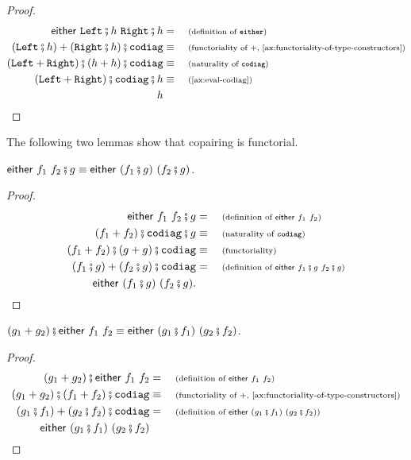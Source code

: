 \begin{proof}
    \begin{align*}
        \either{\leftterm \comp h }{\rightterm \comp h} &= \why{definition of $\mathtt{either}$} \\ 
        (\leftterm \comp h) + (\rightterm \comp h) \comp \codiagterm \equalbecause{functoriality of $+$, \cref{ax:functoriality-of-type-constructors}} \\ 
        (\leftterm + \rightterm) \comp (h + h) \comp \codiagterm \equalbecause{naturality of $\codiagterm$} \\ 
        (\leftterm + \rightterm) \comp \codiagterm \comp h \equalbecause{\cref{ax:eval-codiag}} \\ 
        h
    \end{align*}
\end{proof}

The following two lemmas show that copairing is functorial.
\begin{lemma}\label{lem:functoriality-of-either}
    $\either{f_1}{f_2}\comp g \equiv \either{(f_1\comp g)}{(f_2\comp g)}$.
\end{lemma}
    \begin{proof}
        \begin{align*}
            \either{f_1}{f_2}\comp g &= \why{definition of $\either{f_1}{f_2}$}\\
             (f_1 + f_2)\comp\codiagterm\comp g \equalbecause{naturality of $\codiagterm$}\\
             (f_1 + f_2)\comp(g+g)\comp\codiagterm \equalbecause{functoriality}\\
             (f_1\comp g) + (f_2\comp g)\comp\codiagterm &= \why{definition of $\either{f_1\comp g}{f_2\comp g}$}\\
            \either{(f_1\comp g)}{(f_2\comp g)}.
        \end{align*}
    \end{proof}

\begin{lemma}\label{lem:functoriality-of-either-left}
    $(g_1 + g_2) \comp \either{f_1}{f_2} \equiv \either{(g_1 \comp f_1)}{(g_2 \comp f_2)}$.
\end{lemma}
    \begin{proof}
        \begin{align*}
            (g_1 + g_2) \comp \either{f_1}{f_2} &= \why{definition of $\either{f_1}{f_2}$} \\ 
            (g_1 + g_2) \comp (f_1 + f_2) \comp \codiagterm \equalbecause{functoriality of $+$, \cref{ax:functoriality-of-type-constructors}} \\ 
            (g_1 \comp f_1) + (g_2 \comp f_2) \comp \codiagterm &= \why{definition of $\either{(g_1 \comp f_1)}{(g_2 \comp f_2)}$} \\ 
            \either{(g_1 \comp f_1)}{(g_2 \comp f_2)}
        \end{align*}
    \end{proof}

